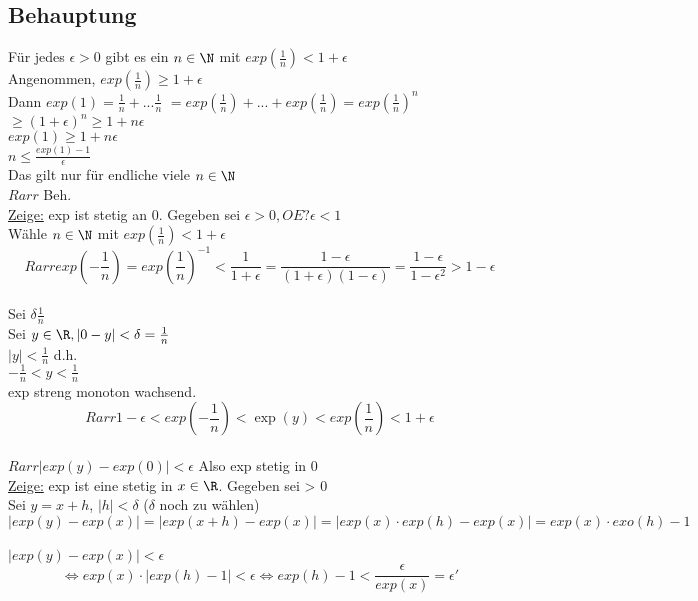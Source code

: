 \subsection*{Behauptung}
Für jedes $\epsilon > 0$ gibt es ein $n \in \N$ mit $exp(\frac{1}{n}) < 1 + \epsilon$\\
Angenommen, $exp(\frac{1}{n}) \geq 1 + \epsilon$\\
Dann $exp(1) = \frac{1}{n} + ... \frac{1}{n}$ %
\phantom{Dann $exp(1) $} $= exp(\frac{1}{n}) + ... + exp(\frac{1}{n}) = exp(\frac{1}{n})^n$ \\
\phantom{Dann $exp(1) $} $ \geq (1 + \epsilon)^n \geq 1 + n \epsilon $ %
\\
$exp(1) \geq 1 + n \epsilon$\\
$n \leq \frac{exp(1) - 1}{\epsilon}$\\
Das gilt nur für endliche viele $n \in \N$\\
$Rarr$ Beh.\\
\underline{Zeige:} exp ist stetig an 0. Gegeben sei $\epsilon > 0, OE ? \epsilon < 1$\\
Wähle $n \in \N$ mit $exp(\frac{1}{n}) < 1 + \epsilon$\\
$$Rarr exp(-\frac{1}{n}) = exp(\frac{1}{n})^{-1} < \frac{1}{1 + \epsilon} = \frac{1 - \epsilon}{(1+\epsilon)(1-\epsilon)} = \frac{1-\epsilon}{1 - \epsilon^2} > 1 - \epsilon$$\\
Sei $\delta \frac{1}{n}$\\
Sei $y \in \R, |0 - y| < \delta = \frac{1}{n}$\\
$|y| < \frac{1}{n}$ d.h.\\
$-\frac{1}{n} < y < \frac{1}{n}$\\
exp streng monoton wachsend.\\
$$Rarr 1 - \epsilon < exp(-\frac{1}{n}) < \exp(y) < exp(\frac{1}{n}) < 1 + \epsilon$$\\
$Rarr |exp(y) - exp(0)| < \epsilon$ Also exp stetig in 0\\
\underline{Zeige:} exp ist eine stetig in $x \in \R$. Gegeben sei \epsilon > 0\\
Sei $y = x + h$, $|h| < \delta$ ($\delta$ noch zu wählen)
$$|exp(y) - exp(x)| = |exp(x + h) - exp(x)| = |exp(x) \cdot exp(h) - exp(x)| = exp(x) \cdot exo(h) -1$$\\
$|exp(y) -exp(x) | < \epsilon$\\
$$\Leftrightarrow exp(x) \cdot |exp(h) - 1| < \epsilon \Leftrightarrow exp(h) - 1 < \frac{\epsilon}{exp(x)} = \epsilon '$$\\
